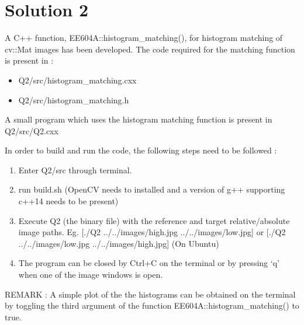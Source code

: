 \documentclass[a4paper,fleqn,11pt]{article}
\theoremstyle{mytheor}
\begin{document}
\section*{Solution 2}
A C++ function, EE604A::histogram\_matching(), for histogram matching of cv::Mat images has been developed.
The code required for the matching function is present in :
\begin{itemize}
\item Q2/src/histogram\_matching.cxx
\item Q2/src/histogram\_matching.h 
\end{itemize}
A small program which uses the histogram matching function is present in Q2/src/Q2.cxx

In order to build and run the code, the following steps need to be followed :
\begin{enumerate}
\item Enter Q2/src through terminal.
\item run build.sh (OpenCV needs to installed and a version of g++ supporting c++14 needs to be present)
\item Execute Q2 (the binary file) with the reference and target relative/absolute image paths. Eg. [./Q2 ../../images/high.jpg ../../images/low.jpg] or [./Q2 ../../images/low.jpg ../../images/high.jpg] (On Ubuntu)
\item The program can be closed by Ctrl+C on the terminal or by pressing `q' when one of the image windows is open.
\end{enumerate}
REMARK : A simple plot of the the histograms can be obtained on the terminal by toggling the third argument of the function EE604A::histogram\_matching() to true.

\pagebreak
\end{document}
